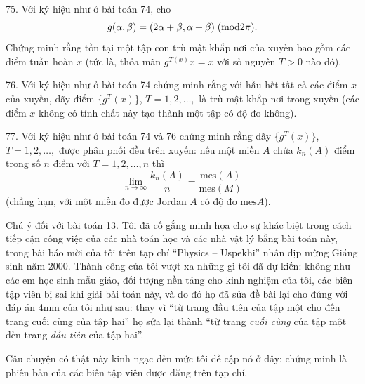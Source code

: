 \begin{problem}{75.}
	Với ký hiệu như ở bài toán 74, cho
	$$g(\alpha, \beta)=(2\alpha+\beta, \alpha+\beta) \; ({\rm mod} 2\pi).$$
	Chứng minh rằng tồn tại một tập con trù mật khắp nơi của xuyến bao gồm các điểm tuần hoàn $x$ (tức là, thỏa mãn $g^{T(x)}x=x$ với số nguyên $T>0$ nào đó).
\end{problem}

\begin{problem}{76.}
	Với ký hiệu như ở bài toán 74 chứng minh rằng với hầu hết tất cả các điểm $x$ của xuyến, dãy điểm $\{g^T(x)\}$, $T=1,2,\ldots,$ là trù mật khắp nơi trong xuyến (các điểm $x$ không có tính chất này tạo thành một tập có độ đo không).
\end{problem}

\begin{problem}{77.}
	Với ký hiệu như ở bài toán 74 và 76 chứng minh rằng dãy $\{g^T(x)\}$, $T=1,2,\ldots,$ được phân phối đều trên xuyến: nếu một miền $A$ chứa $k_n(A)$ điểm trong số $n$ điểm với $T=1,2,\ldots, n$ thì
	$$\lim_{n\rightarrow \infty}\frac{k_n(A)}{n}=\frac{\mbox{mes}(A)}{\mbox{mes}(M)}$$
	(chẳng hạn, với một miền đo được Jordan $A$ có độ đo $\mbox{mes} A$).
\end{problem}

\begin{note}{Chú ý đối với bài toán 13.}
	Tôi đã cố gắng minh họa cho sự khác biệt trong cách tiếp cận công việc của các nhà toán học và các nhà vật lý bằng bài toán này, trong bài báo mời của tôi trên tạp chí \enquote{Physics -- Uspekhi} nhân dịp mừng Giáng sinh năm 2000. Thành công của tôi vượt xa những gì tôi đã dự kiến: không như các em học sinh mẫu giáo, đối tượng nền tảng cho kinh nghiệm của tôi, các biên tập viên bị sai khi giải bài toán này, và do đó họ đã sửa đề bài lại cho đúng với đáp án 4mm của tôi như sau: thay vì \enquote{từ trang đầu tiên của tập một cho đến trang cuối cùng của tập hai} họ sửa lại thành \enquote{từ trang \emph{cuối cùng} của tập một đến trang \emph{đầu tiên} của tập hai}.

	Câu chuyện có thật này kinh ngạc đến mức tôi đề cập nó ở đây: chứng minh là phiên bản của các biên tập viên được đăng trên tạp chí.
\end{note}
\clearpage

